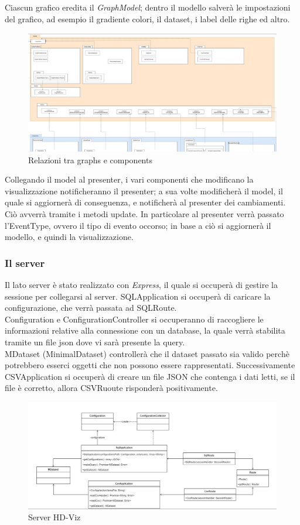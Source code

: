 \documentclass[../manuale_sviluppatore.tex]{subfiles}
\begin{document}
Ciascun grafico eredita il \emph{GraphModel}; dentro il modello salverà le impostazioni del grafico, ad esempio il gradiente colori, il dataset, i label delle righe ed altro.

\begin{figure}[H]
	\centering
	\includegraphics[width=18cm]{img/graphs-e-components.jpg}
	\caption{Relazioni tra graphs e components}
\end{figure}


Collegando il model al presenter, i vari componenti che modificano la visualizzazione notificheranno il presenter; a sua volte modificherà il model, il quale si aggiornerà di conseguenza, 
e notificherà al presenter dei cambiamenti.
Ciò avverrà tramite i metodi update. In particolare al presenter verrà passato l'EventType, ovvero il tipo di evento occorso; in base a ciò si aggiornerà il modello, e quindi la visualizzazione.

\subsubsection{Il server}

Il lato server è stato realizzato con \emph{Express}, il quale si occuperà di gestire la sessione per collegarsi al server.
SQLApplication si occuperà di caricare la configurazione, che verrà passata ad SQLRoute.\\
Configuration e ConfigurationController si occuperanno di raccogliere le informazioni relative alla connessione con un database, la quale verrà stabilita tramite un file
json dove vi sarà presente la query.\\
MDataset (MinimalDataset) controllerà che il dataset passato sia valido perchè potrebbero esserci oggetti che non possono essere rappresentati. Successivamente
CSVApplication si occuperà di creare un file JSON che contenga i dati letti, se il file è corretto, allora CSVRuoute risponderà positivamente.

\begin{figure}[H]
	\centering
	\includegraphics[width=18cm]{img/server.jpg}
	\caption{Server HD-Viz}
\end{figure}
\end{document}
